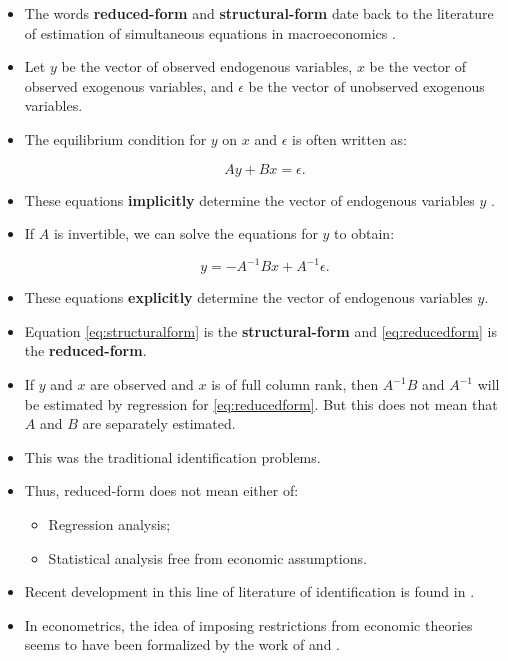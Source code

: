 \documentclass[]{book}
\providecommand{\tightlist}{%
  \setlength{\itemsep}{0pt}\setlength{\parskip}{0pt}}
\theoremstyle{definition}
\theoremstyle{definition}
\theoremstyle{definition}
\theoremstyle{remark}
\begin{document}
\begin{itemize}
\tightlist
\item
  The words \textbf{reduced-form} and \textbf{structural-form} date back
  to the literature of estimation of simultaneous equations in
  macroeconomics \citep{Hsiao1983}.
\item
  Let \(y\) be the vector of observed endogenous variables, \(x\) be the
  vector of observed exogenous variables, and \(\epsilon\) be the vector
  of unobserved exogenous variables.
\item
  The equilibrium condition for \(y\) on \(x\) and \(\epsilon\) is often
  written as:

  \begin{equation}
  Ay + Bx = \epsilon. \label{eq:structuralform}
  \end{equation}
\item
  These equations \textbf{implicitly} determine the vector of endogenous
  variables \(y\) .
\item
  If \(A\) is invertible, we can solve the equations for \(y\) to
  obtain:

  \begin{equation}
  y = - A^{-1} B x + A^{-1} \epsilon. \label{eq:reducedform}
  \end{equation}
\item
  These equations \textbf{explicitly} determine the vector of endogenous
  variables \(y\).
\item
  Equation \eqref{eq:structuralform} is the \textbf{structural-form} and
  \eqref{eq:reducedform} is the \textbf{reduced-form}.
\item
  If \(y\) and \(x\) are observed and \(x\) is of full column rank, then
  \(A^{-1}B\) and \(A^{-1}\) will be estimated by regression for
  \eqref{eq:reducedform}. But this does not mean that \(A\) and \(B\) are
  separately estimated.
\item
  This was the traditional identification problems.
\item
  Thus, reduced-form does not mean either of:

  \begin{itemize}
  \tightlist
  \item
    Regression analysis;
  \item
    Statistical analysis free from economic assumptions.
  \end{itemize}
\item
  Recent development in this line of literature of identification is
  found in \citet{Matzkin2007}.
\item
  In econometrics, the idea of imposing restrictions from economic
  theories seems to have been formalized by the work of
  \citet{Manski1994a} and \citet{Matzkin1994b}.
\end{itemize}
\end{document}
